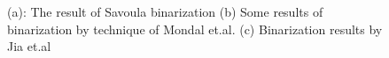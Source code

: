 \documentclass[runningheads]{llncs}
\begin{document}
\begin{figure}[bht!]
\begin{subfigure}[b]{0.35\textwidth}
		\centering {}
		\caption{}
		\label{image_text_19}
	\end{subfigure}	
	\begin{subfigure}[b]{0.32\textwidth}
		\centering {}
		\caption{}
		\label{image_text_20}
	\end{subfigure} 
	\caption[endProcess]{(a): The result of Savoula binarization (b) Some results of binarization by technique of Mondal et.al.\cite{Mondal2019}   (c) Binarization results by Jia et.al \cite{Jia2018}}
	\label{fig:imgBinari}
\end{figure}
\end{document}
